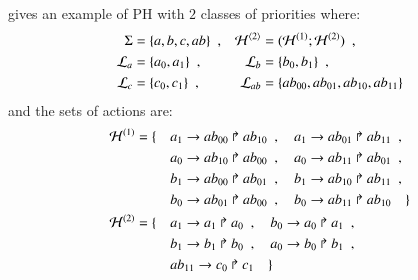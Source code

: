 \begin{example}
   gives an example of PH with $2$ classes of priorities where:
  \begin{align*}
    \Sigma &= \{ a, b, c, ab \} \enspace,
      & \mathcal{H}^{\langle 2 \rangle} &= (\mathcal{H}^{(1)}; \mathcal{H}^{(2)}) \enspace, \\
    \mathcal{L}_a &= \{ a_0, a_1 \} \enspace,
      & \mathcal{L}_b &= \{ b_0, b_1 \} \enspace, \\
    \mathcal{L}_c &= \{ c_0, c_1 \} \enspace,
      & \mathcal{L}_{ab} &= \{ ab_{00}, ab_{01}, ab_{10}, ab_{11} \}
  \end{align*}
  and the sets of actions are:
  \begin{align*}
    \mathcal{H}^{(1)} = \{ \quad
      & a_1\rightarrow ab_{00}\Rsh ab_{10} \enspace , \quad
      a_1\rightarrow ab_{01}\Rsh ab_{11} \enspace , \\
      & a_0\rightarrow ab_{10}\Rsh ab_{00} \enspace , \quad
      a_0\rightarrow ab_{11}\Rsh ab_{01} \enspace , \\
      & b_1\rightarrow ab_{00}\Rsh ab_{01} \enspace , \quad
      b_1\rightarrow ab_{10}\Rsh ab_{11} \enspace , \\
      & b_0\rightarrow ab_{01}\Rsh ab_{00} \enspace , \quad
      b_0\rightarrow ab_{11}\Rsh ab_{10}
    \quad \} \\
    \mathcal{H}^{(2)} = \{ \quad
      & a_1\rightarrow a_1\Rsh a_0 \enspace , \quad
      b_0\rightarrow a_0\Rsh a_1 \enspace , \\
      & b_1\rightarrow b_1\Rsh b_0 \enspace , \quad
      a_0\rightarrow b_0\Rsh b_1 \enspace , \\
      & ab_{11}\rightarrow c_0\Rsh c_1
    \quad \} \\
  \end{align*}

\begin{figure}[tb]
  \centering
\end{figure}
\end{example}
